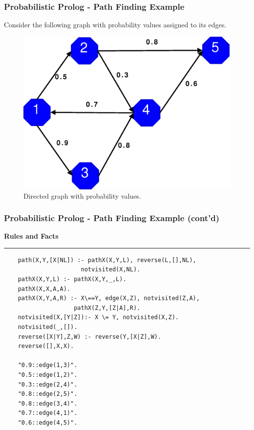 \documentclass{beamer}
\newenvironment{mylisting}
{\begin{list}{}{\setlength{\leftmargin}{1em}}\item\scriptsize\bfseries}
{\end{list}}
\begin{document}
\begin{frame}[fragile]
	\frametitle{Probabilistic Prolog - Path Finding Example}
	Consider the following graph with probability values assigned to its edges.
	\begin{figure}[ht]
	\begin{center}
	\includegraphics[width=.6\paperwidth]{../img/graph.eps}
	\caption{Directed graph with probability values.}
	\label{fig:graph}
	\end{center}
	\end{figure}
\end{frame}

\begin{frame}[fragile]
	\frametitle{Probabilistic Prolog - Path Finding Example (cont'd)}
	\begin{mylisting}
	Rules and Facts
	\vspace*{2px}\hrule
	\begin{verbatim}
	path(X,Y,[X|NL]) :- pathX(X,Y,L), reverse(L,[],NL), 
                      notvisited(X,NL).
	pathX(X,Y,L) :- pathX(X,Y,_,L).
	pathX(X,X,A,A).
	pathX(X,Y,A,R) :- X\==Y, edge(X,Z), notvisited(Z,A), 
                    pathX(Z,Y,[Z|A],R).
	notvisited(X,[Y|Z]):- X \= Y, notvisited(X,Z).
	notvisited(_,[]).
	reverse([X|Y],Z,W) :- reverse(Y,[X|Z],W).
	reverse([],X,X).

	"0.9::edge(1,3)".
	"0.5::edge(1,2)".
	"0.3::edge(2,4)".
	"0.8::edge(2,5)".
	"0.8::edge(3,4)".
	"0.7::edge(4,1)".
	"0.6::edge(4,5)".
	\end{verbatim}
	\end{mylisting}
\end{frame}
\end{document}
